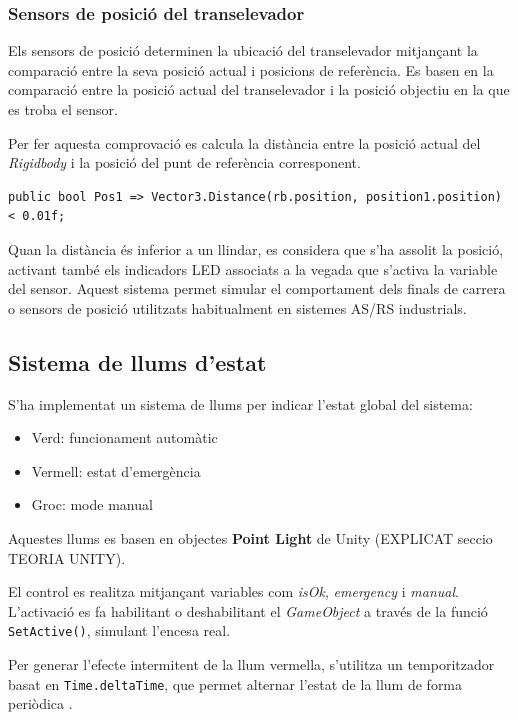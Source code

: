 \documentclass[12pt,a4paper]{report}
\begin{document}
\subsubsection{Sensors de posició del transelevador}

Els sensors de posició determinen la ubicació del transelevador mitjançant la comparació entre la seva posició actual i posicions de referència. Es basen en la comparació entre la posició actual del transelevador i la posició objectiu en la que es troba el sensor.

Per fer aquesta comprovació es calcula la distància entre la posició actual del \textit{Rigidbody} i la posició del punt de referència corresponent.

\begin{lstlisting}[language=CSharp]
public bool Pos1 => Vector3.Distance(rb.position, position1.position) < 0.01f;
\end{lstlisting}

Quan la distància és inferior a un llindar, es considera que s'ha assolit la posició, activant també els indicadors LED associats a la vegada que s'activa la variable del sensor. Aquest sistema permet simular el comportament dels finals de carrera o sensors de posició utilitzats habitualment en sistemes AS/RS industrials.

\subsection{Sistema de llums d'estat}

S'ha implementat un sistema de llums \cite{UnityLighting} per indicar l'estat global del sistema:

\begin{itemize}
\item Verd: funcionament automàtic
\item Vermell: estat d'emergència
\item Groc: mode manual
\end{itemize}

Aquestes llums es basen en objectes \textbf{Point Light} de Unity (EXPLICAT seccio TEORIA UNITY).

El control es realitza mitjançant variables com \textit{isOk}, \textit{emergency} i \textit{manual}. L'activació es fa habilitant o deshabilitant el \textit{GameObject} a través de la funció \texttt{SetActive()}, simulant l'encesa real.

Per generar l'efecte intermitent de la llum vermella, s'utilitza un temporitzador basat en \texttt{Time.deltaTime}, que permet alternar l'estat de la llum de forma periòdica \cite{UnityTime}.
\end{document}
